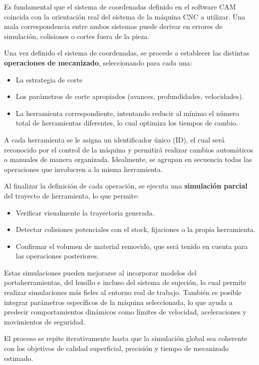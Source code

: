 Es fundamental que el sistema de coordenadas definido en el software CAM coincida con la orientación real del sistema de la máquina CNC a utilizar. Una mala correspondencia entre ambos sistemas puede derivar en errores de simulación, colisiones o cortes fuera de la pieza. 

Una vez definido el sistema de coordenadas, se procede a establecer las distintas \textbf{operaciones de mecanizado}, seleccionando para cada una:
\begin{itemize}
	\item La estrategia de corte 
	\item Los parámetros de corte apropiados (avances, profundidades, velocidades).
	\item La herramienta correspondiente, intentando reducir al mínimo el número total de herramientas diferentes, lo cual optimiza los tiempos de cambio. 
\end{itemize}

A cada herramienta se le asigna un identificador único (ID), el cual será reconocido por el control de la máquina y permitirá realizar cambios automáticos o manuales de manera organizada. Idealmente, se agrupan en secuencia todas las operaciones que involucren a la misma herramienta.

Al finalizar la definición de cada operación, se ejecuta una \textbf{simulación parcial} del trayecto de herramienta, lo que permite:
\begin{itemize}
	\item Verificar visualmente la trayectoria generada.
	\item Detectar colisiones potenciales con el stock, fijaciones o la propia herramienta.
	\item Confirmar el volumen de material removido, que será tenido en cuenta para las operaciones posteriores.
\end{itemize}

Estas simulaciones pueden mejorarse al incorporar modelos del portaherramientas, del husillo e incluso del sistema de sujeción, lo cual permite realizar simulaciones más fieles al entorno real de trabajo. También es posible integrar parámetros específicos de la máquina seleccionada, lo que ayuda a predecir comportamientos dinámicos como límites de velocidad, aceleraciones y movimientos de seguridad.

El proceso se repite iterativamente hasta que la simulación global sea coherente con los objetivos de calidad superficial, precisión y tiempo de mecanizado estimado.

